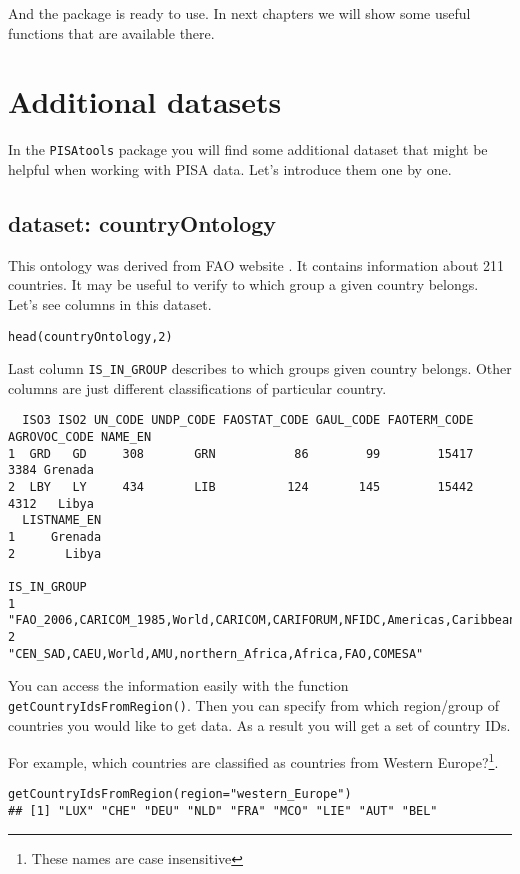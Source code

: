 And the package is ready to use.
In next chapters we will show some useful functions that are available there.

\section*{Additional datasets}

In the \verb:PISAtools: package you will find some additional dataset that might be helpful when working with PISA data. Let's introduce them one by one.

\subsection*{dataset: countryOntology}
This ontology was derived from FAO website \cite{FAOwebsite}. It contains information about 211 countries. It may be useful to verify to which group a given country belongs. Let's see columns in this dataset.

\begin{shaded}\begin{verbatim}
head(countryOntology,2)
\end{verbatim}\end{shaded}

Last column \verb:IS_IN_GROUP: describes to which groups given country belongs. Other columns are just different classifications of particular country. 

\begin{shaded}\begin{verbatim}
  ISO3 ISO2 UN_CODE UNDP_CODE FAOSTAT_CODE GAUL_CODE FAOTERM_CODE AGROVOC_CODE NAME_EN
1  GRD   GD     308       GRN           86        99        15417         3384 Grenada
2  LBY   LY     434       LIB          124       145        15442         4312   Libya
  LISTNAME_EN
1     Grenada
2       Libya
                                                                        IS_IN_GROUP
1 "FAO_2006,CARICOM_1985,World,CARICOM,CARIFORUM,NFIDC,Americas,Caribbean,FAO,SIDS"
2                        "CEN_SAD,CAEU,World,AMU,northern_Africa,Africa,FAO,COMESA"
\end{verbatim}\end{shaded}

You can access the information easily with the function \verb:getCountryIdsFromRegion():. Then you can specify from which region/group of countries you would like to get data. As a result you will get a set of country IDs.

For example, which countries are classified as countries from Western Europe?\footnote{These names are case insensitive}.

\begin{shaded}\begin{verbatim}
getCountryIdsFromRegion(region="western_Europe")
## [1] "LUX" "CHE" "DEU" "NLD" "FRA" "MCO" "LIE" "AUT" "BEL"
\end{verbatim}\end{shaded}


